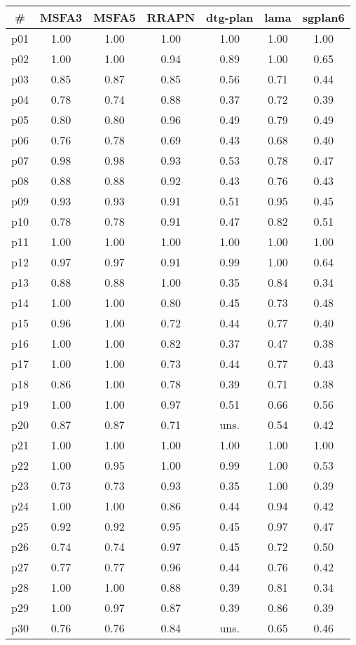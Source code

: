 \begin{tabular}{ccccccc}
\toprule
\textbf{\#} & \textbf{MSFA3} & \textbf{MSFA5} & \textbf{RRAPN} & \textbf{dtg-plan} & \textbf{lama} & \textbf{sgplan6}\\
\midrule
p01 & 1.00 & 1.00 & 1.00 & 1.00 & 1.00 & 1.00\\
p02 & 1.00 & 1.00 & 0.94 & 0.89 & 1.00 & 0.65\\
p03 & 0.85 & 0.87 & 0.85 & 0.56 & 0.71 & 0.44\\
p04 & 0.78 & 0.74 & 0.88 & 0.37 & 0.72 & 0.39\\
p05 & 0.80 & 0.80 & 0.96 & 0.49 & 0.79 & 0.49\\
p06 & 0.76 & 0.78 & 0.69 & 0.43 & 0.68 & 0.40\\
p07 & 0.98 & 0.98 & 0.93 & 0.53 & 0.78 & 0.47\\
p08 & 0.88 & 0.88 & 0.92 & 0.43 & 0.76 & 0.43\\
p09 & 0.93 & 0.93 & 0.91 & 0.51 & 0.95 & 0.45\\
p10 & 0.78 & 0.78 & 0.91 & 0.47 & 0.82 & 0.51\\
p11 & 1.00 & 1.00 & 1.00 & 1.00 & 1.00 & 1.00\\
p12 & 0.97 & 0.97 & 0.91 & 0.99 & 1.00 & 0.64\\
p13 & 0.88 & 0.88 & 1.00 & 0.35 & 0.84 & 0.34\\
p14 & 1.00 & 1.00 & 0.80 & 0.45 & 0.73 & 0.48\\
p15 & 0.96 & 1.00 & 0.72 & 0.44 & 0.77 & 0.40\\
p16 & 1.00 & 1.00 & 0.82 & 0.37 & 0.47 & 0.38\\
p17 & 1.00 & 1.00 & 0.73 & 0.44 & 0.77 & 0.43\\
p18 & 0.86 & 1.00 & 0.78 & 0.39 & 0.71 & 0.38\\
p19 & 1.00 & 1.00 & 0.97 & 0.51 & 0.66 & 0.56\\
p20 & 0.87 & 0.87 & 0.71 & uns. & 0.54 & 0.42\\
p21 & 1.00 & 1.00 & 1.00 & 1.00 & 1.00 & 1.00\\
p22 & 1.00 & 0.95 & 1.00 & 0.99 & 1.00 & 0.53\\
p23 & 0.73 & 0.73 & 0.93 & 0.35 & 1.00 & 0.39\\
p24 & 1.00 & 1.00 & 0.86 & 0.44 & 0.94 & 0.42\\
p25 & 0.92 & 0.92 & 0.95 & 0.45 & 0.97 & 0.47\\
p26 & 0.74 & 0.74 & 0.97 & 0.45 & 0.72 & 0.50\\
p27 & 0.77 & 0.77 & 0.96 & 0.44 & 0.76 & 0.42\\
p28 & 1.00 & 1.00 & 0.88 & 0.39 & 0.81 & 0.34\\
p29 & 1.00 & 0.97 & 0.87 & 0.39 & 0.86 & 0.39\\
p30 & 0.76 & 0.76 & 0.84 & uns. & 0.65 & 0.46\\
\bottomrule
\end{tabular}

